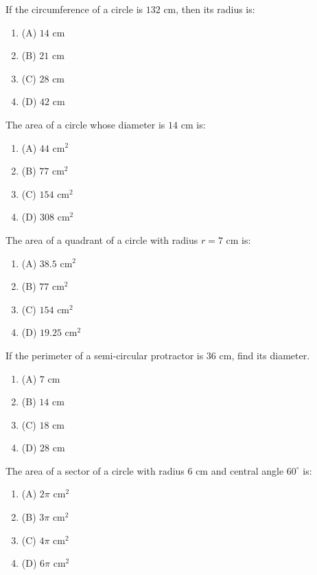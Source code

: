 \documentclass[12pt,a4paper]{exam}
\begin{document}
\begin{questions}
\question[1] If the circumference of a circle is $132 \text{ cm}$, then its radius is:
\begin{enumerate}[label=(\Alph*)]
  \item (A) $14 \text{ cm}$
  \item (B) $21 \text{ cm}$
  \item (C) $28 \text{ cm}$
  \item (D) $42 \text{ cm}$
\end{enumerate}
\vspace{0.15cm}

\question[1] The area of a circle whose diameter is $14 \text{ cm}$ is:
\begin{enumerate}[label=(\Alph*)]
  \item (A) $44 \text{ cm}^2$
  \item (B) $77 \text{ cm}^2$
  \item (C) $154 \text{ cm}^2$
  \item (D) $308 \text{ cm}^2$
\end{enumerate}
\vspace{0.15cm}

\question[1] The area of a quadrant of a circle with radius $r = 7 \text{ cm}$ is:
\begin{enumerate}[label=(\Alph*)]
  \item (A) $38.5 \text{ cm}^2$
  \item (B) $77 \text{ cm}^2$
  \item (C) $154 \text{ cm}^2$
  \item (D) $19.25 \text{ cm}^2$
\end{enumerate}
\vspace{0.15cm}

\question[1] If the perimeter of a semi-circular protractor is $36 \text{ cm}$, find its diameter.
\begin{enumerate}[label=(\Alph*)]
  \item (A) $7 \text{ cm}$
  \item (B) $14 \text{ cm}$
  \item (C) $18 \text{ cm}$
  \item (D) $28 \text{ cm}$
\end{enumerate}
\vspace{0.15cm}

\question[1] The area of a sector of a circle with radius $6 \text{ cm}$ and central angle $60^\circ$ is:
\begin{enumerate}[label=(\Alph*)]
  \item (A) $2\pi \text{ cm}^2$
  \item (B) $3\pi \text{ cm}^2$
  \item (C) $4\pi \text{ cm}^2$
  \item (D) $6\pi \text{ cm}^2$
\end{enumerate}
\vspace{0.15cm}


\end{questions}
\end{document}
